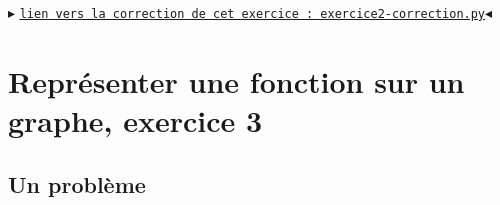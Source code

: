 \documentclass[11pt]{article}
\begin{document}
\bigskip

\bigskip


\begin{center}
$\blacktriangleright$ \href{https://github.com/formationPythonPC-Juin/corrections-formation/blob/master/exercice2-correction.py}{\underline{\texttt{lien vers la correction de cet exercice : exercice2-correction.py}}}$\blacktriangleleft$                                                                                                                                                                    \end{center}

























\section{Représenter une fonction sur un graphe, exercice 3}

\subsection{Un problème}
\end{document}
